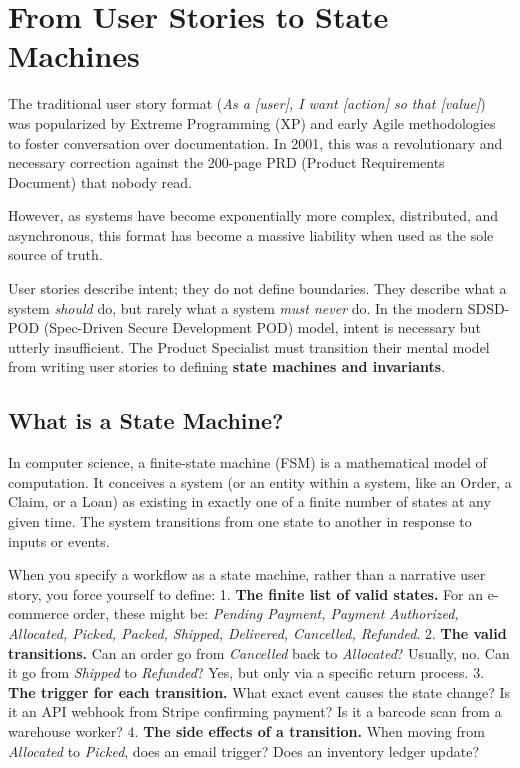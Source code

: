 \documentclass[
  11pt,
  openany,
  oneside]{book}
\begin{document}
\section{From User Stories to State
Machines}\label{from-user-stories-to-state-machines}

The traditional user story format (\emph{As a {[}user{]}, I want
{[}action{]} so that {[}value{]}}) was popularized by Extreme
Programming (XP) and early Agile methodologies to foster conversation
over documentation. In 2001, this was a revolutionary and necessary
correction against the 200-page PRD (Product Requirements Document) that
nobody read.

However, as systems have become exponentially more complex, distributed,
and asynchronous, this format has become a massive liability when used
as the sole source of truth.

User stories describe intent; they do not define boundaries. They
describe what a system \emph{should} do, but rarely what a system
\emph{must never} do. In the modern SDSD-POD (Spec-Driven Secure
Development POD) model, intent is necessary but utterly insufficient.
The Product Specialist must transition their mental model from writing
user stories to defining \textbf{state machines and invariants}.

\subsection{What is a State Machine?}\label{what-is-a-state-machine}

In computer science, a finite-state machine (FSM) is a mathematical
model of computation. It conceives a system (or an entity within a
system, like an Order, a Claim, or a Loan) as existing in exactly one of
a finite number of states at any given time. The system transitions from
one state to another in response to inputs or events.

When you specify a workflow as a state machine, rather than a narrative
user story, you force yourself to define: 1. \textbf{The finite list of
valid states.} For an e-commerce order, these might be: \emph{Pending
Payment, Payment Authorized, Allocated, Picked, Packed, Shipped,
Delivered, Cancelled, Refunded}. 2. \textbf{The valid transitions.} Can
an order go from \emph{Cancelled} back to \emph{Allocated}? Usually, no.
Can it go from \emph{Shipped} to \emph{Refunded}? Yes, but only via a
specific return process. 3. \textbf{The trigger for each transition.}
What exact event causes the state change? Is it an API webhook from
Stripe confirming payment? Is it a barcode scan from a warehouse worker?
4. \textbf{The side effects of a transition.} When moving from
\emph{Allocated} to \emph{Picked}, does an email trigger? Does an
inventory ledger update?
\end{document}
